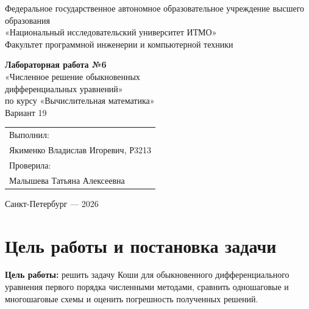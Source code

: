 \documentclass[12pt,a4paper]{article}
\begin{document}
\hypersetup{pageanchor=false}
\begin{titlepage}
  \thispagestyle{empty}
  \begin{center}
    {\small Федеральное государственное автономное образовательное учреждение высшего образования\\
    «Национальный исследовательский университет ИТМО»}\\[0.8em]
    {\small Факультет программной инженерии и компьютерной техники}

    \vfill

    {\Large\textbf{Лабораторная работа №6}}\\[0.6em]
    {\large «Численное решение обыкновенных\\дифференциальных уравнений»}\\[0.6em]
    {\large по курсу «Вычислительная математика»}\\[0.6em]
    {\large Вариант 19}

    \vfill

    \begin{flushright}
      \begin{tabular}{l}
        Выполнил:\\
        Якименко Владислав Игоревич, Р3213\\[0.8em]
        Проверила:\\
        Малышева Татьяна Алексеевна
      \end{tabular}
    \end{flushright}

    \vfill

    Санкт-Петербург --- 2026
  \end{center}
\end{titlepage}
\clearpage
\hypersetup{pageanchor=true}

\tableofcontents
\thispagestyle{empty}
\clearpage
{}


\section{Цель работы и постановка задачи}

\textbf{Цель работы:} решить задачу Коши для обыкновенного дифференциального
уравнения первого порядка численными методами, сравнить одношаговые и
многошаговые схемы и оценить погрешность полученных решений.
\end{document}
